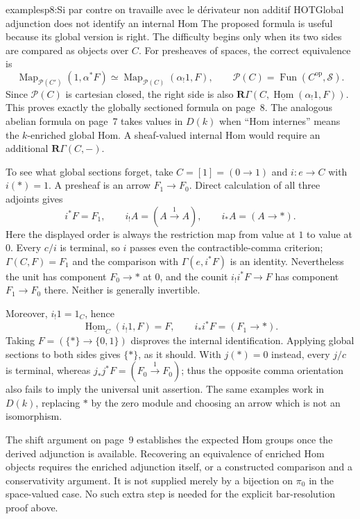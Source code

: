 \begin{dcomment}{examples}{p8:Si par contre on travaille avec le dérivateur non additif HOT}{Global adjunction does not identify an internal Hom}
The proposed formula is useful because its global version is right. The difficulty begins only when its two sides are compared as objects over $C$. For presheaves of spaces, the correct equivalence is
\[
 \operatorname{Map}_{\mathcal P(C')}(1,\alpha^*F)
 \simeq
 \operatorname{Map}_{\mathcal P(C)}(\alpha_!1,F),
 \qquad \mathcal P(C)=\operatorname{Fun}(C^{\mathrm{op}},\mathcal S).
\]
Since $\mathcal P(C)$ is cartesian closed, the right side is also
$\mathbf R\Gamma(C,\underline{\operatorname{Hom}}(\alpha_!1,F))$.
This proves exactly the globally sectioned formula on page~8. The analogous abelian formula on page~7 takes values in $D(k)$ when ``Hom internes'' means the $k$-enriched global Hom. A sheaf-valued internal Hom would require an additional $\mathbf R\Gamma(C,-)$.

To see what global sections forget, take $C=[1]=(0\to1)$ and $i:e\to C$ with $i(*)=1$. A presheaf is an arrow $F_1\to F_0$. Direct calculation of all three adjoints gives
\[
 i^*F=F_1,\qquad i_!A=(A\xrightarrow{1}A),
 \qquad i_*A=(A\to *).
\]
Here the displayed order is always the restriction map from value at $1$ to value at $0$. Every $c/i$ is terminal, so $i$ passes even the contractible-comma criterion; $\Gamma(C,F)=F_1$ and the comparison with $\Gamma(e,i^*F)$ is an identity. Nevertheless the unit has component $F_0\to *$ at $0$, and the counit $i_!i^*F\to F$ has component $F_1\to F_0$ there. Neither is generally invertible.

Moreover, $i_!1=1_C$, hence
\[
 \underline{\operatorname{Hom}}_C(i_!1,F)=F,
 \qquad i_*i^*F=(F_1\to *).
\]
Taking $F=(\{*\}\to\{0,1\})$ disproves the internal identification. Applying global sections to both sides gives $\{*\}$, as it should. With $j(*)=0$ instead, every $j/c$ is terminal, whereas $j_*j^*F=(F_0\xrightarrow{1}F_0)$; thus the opposite comma orientation also fails to imply the universal unit assertion. The same examples work in $D(k)$, replacing $*$ by the zero module and choosing an arrow which is not an isomorphism.

The shift argument on page~9 establishes the expected Hom groups once the derived adjunction is available. Recovering an equivalence of enriched Hom objects requires the enriched adjunction itself, or a constructed comparison and a conservativity argument. It is not supplied merely by a bijection on $\pi_0$ in the space-valued case. No such extra step is needed for the explicit bar-resolution proof above.
\end{dcomment}

